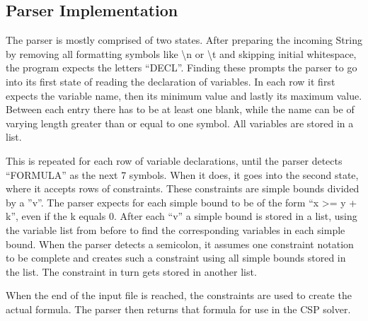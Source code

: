 
\subsection{Parser Implementation}

The parser is mostly comprised of two states. After preparing the incoming String by removing all formatting symbols like \textbackslash n or \textbackslash t and skipping initial whitespace, the program expects the letters ``DECL''. Finding these prompts the parser to go into its first state of reading the declaration of variables. In each row it first expects the variable name, then its minimum value and lastly its maximum value. Between each entry there has to be at least one blank, while the name can be of varying length greater than or equal to one symbol. All variables are stored in a list.

This is repeated for each row of variable declarations, until the parser detects ``FORMULA'' as the next 7 symbols. When it does, it goes into the second state, where it accepts rows of constraints. These constraints are simple bounds divided by a ''v''. The parser expects for each simple bound to be of the form ``x >= y + k'', even if the k equals 0. After each ``v'' a simple bound is stored in a list, using the variable list from before to find the corresponding variables in each simple bound. When the parser detects a semicolon, it assumes one constraint notation to be complete and creates such a constraint using all simple bounds stored in the list. The constraint in turn gets stored in another list.

When the end of the input file is reached, the constraints are used to create the actual formula.
The parser then returns that formula for use in the CSP solver.
